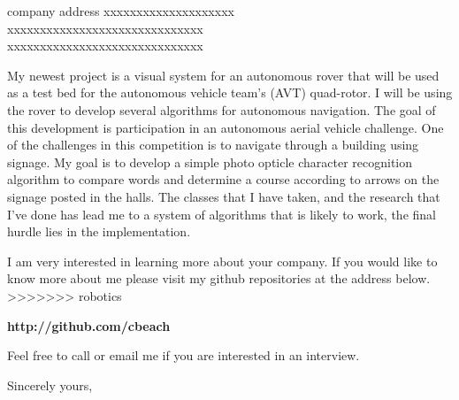 \documentclass{letter} %
\begin{document}
\begin{letter}{company address xxxxxxxxxxxxxxxxxxxx \\
xxxxxxxxxxxxxxxxxxxxxxxxxxxxxx \\
xxxxxxxxxxxxxxxxxxxxxxxxxxxxxx }
\begin{flushleft}
\noindent My newest project is a visual system for an autonomous rover that will be used as a test bed for the autonomous vehicle team's (AVT)
quad-rotor.  I will be using the rover to develop several algorithms for autonomous navigation.  The goal of this development
is participation in an autonomous aerial vehicle challenge.  One of the challenges in this competition is to navigate
through a building using signage.  My goal is to develop a simple photo opticle character recognition algorithm to 
compare words and determine a course according to arrows on the signage posted in the halls.  The classes that I have taken,
and the research that I've done has lead me to a system of algorithms that is likely to work, the final hurdle lies in the 
implementation.

\noindent I am very interested in learning more about your company.  
If you would like to know more about me please visit my github repositories at the address below. \\ 
>>>>>>> robotics

\end{flushleft}
\begin{center}
	\textbf{http://github.com/cbeach}
\end{center}

Feel free to call or email me if you are interested in an interview.

\closing{Sincerely yours,} 
 

 

\end{letter}
 
\end{document}
